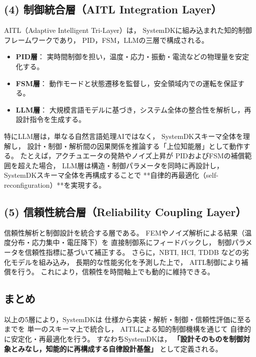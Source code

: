 \subsection{(4) 制御統合層（AITL Integration Layer）}
AITL（Adaptive Intelligent Tri-Layer）は，
SystemDKに組み込まれた知的制御フレームワークであり，
PID，FSM，LLMの三層で構成される。

\begin{itemize}
  \item \textbf{PID層}： 実時間制御を担い，温度・応力・振動・電流などの物理量を安定化する。
  \item \textbf{FSM層}： 動作モードと状態遷移を監督し，安全領域内での運転を保証する。
  \item \textbf{LLM層}： 大規模言語モデルに基づき，システム全体の整合性を解析し，再設計指令を生成する。
\end{itemize}

特にLLM層は，単なる自然言語処理AIではなく，
SystemDKスキーマ全体を理解し，
設計・制御・解析間の因果関係を推論する「上位知能層」として動作する。
たとえば，アクチュエータの発熱やノイズ上昇が
PIDおよびFSMの補償範囲を超えた場合，
LLM層は構造・制御パラメータを同時に再設計し，
SystemDKスキーマ全体を再構成することで
**自律的再最適化（self-reconfiguration）**を実現する。

\subsection{(5) 信頼性統合層（Reliability Coupling Layer）}
信頼性解析と制御設計を統合する層である。
FEMやノイズ解析による結果（温度分布・応力集中・電圧降下）を
直接制御系にフィードバックし，
制御パラメータを信頼性指標に基づいて補正する。
さらに，NBTI, HCI, TDDB などの劣化モデルを組み込み，
長期的な性能劣化を予測した上で，
AITL制御により補償を行う。
これにより，信頼性を時間軸上でも動的に維持できる。

\subsection*{まとめ}
以上の5層により，SystemDKは
仕様から実装・解析・制御・信頼性評価に至るまでを
単一のスキーマ上で統合し，
AITLによる知的制御機構を通じて
自律的に安定化・再最適化を行う。
すなわちSystemDKは，
\textbf{「設計そのものを制御対象とみなし，知能的に再構成する自律設計基盤」}
として定義される。

